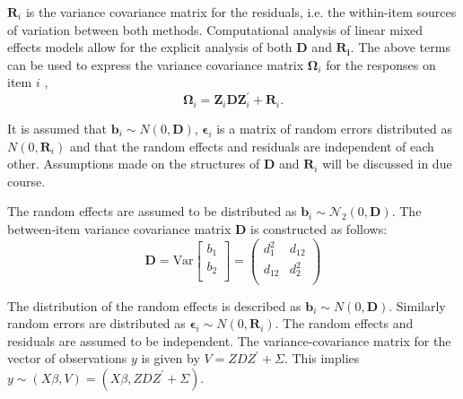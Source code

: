 \documentclass[12pt, a4paper]{report}
\theoremstyle{plain}
\theoremstyle{definition}
\theoremstyle{remark}
\begin{document}
		$\boldsymbol{R}_{i}$ is the variance covariance matrix for the residuals, i.e. the within-item sources of variation between both methods. Computational analysis of linear mixed effects models allow for the explicit analysis of both $\boldsymbol{D}$ and $\boldsymbol{R_i}$.
		The above terms can be used to express the  variance covariance matrix $\boldsymbol{\Omega}_i$ for the responses on item $i$ ,
		\[
		\boldsymbol{\Omega}_i = \boldsymbol{Z}_i \boldsymbol{D} \boldsymbol{Z}_i^{\prime} + \boldsymbol{R}_i.
		\]
		
		It is assumed that $\boldsymbol{b}_i \sim N(0,\boldsymbol{D})$, $\boldsymbol{\epsilon}_i$ is a matrix of random errors distributed as $N(0,\boldsymbol{R}_i)$ and that the random effects and residuals are independent of each other. Assumptions made on the structures of $\boldsymbol{D}$ and $\boldsymbol{R}_i$ will be discussed in due course.
		
		The random effects are assumed to be distributed as $\boldsymbol{b}_i \sim \mathcal{N}_2(0,\boldsymbol{D})$. The between-item variance covariance matrix $\boldsymbol{D}$ is constructed as follows:
		\[ \boldsymbol{D} = \mbox{Var}  \left[
		\begin{array}{c}
		b_1   \\
		b_2  \\
		\end{array}
		\right] =  \left(
		\begin{array}{cc}
		d^2_1  & d_{12} \\
		d_{12} & d^2_2 \\
		\end{array}
		\right) \]
		

	
		The distribution of the random effects is described as $\boldsymbol{b}_i \sim N(0,\boldsymbol{D})$. Similarly random errors are distributed as $\boldsymbol{\epsilon}_i \sim N(0,\boldsymbol{R}_i)$. The random effects and residuals are assumed to be independent. The variance-covariance matrix for the vector of observations $y$ is given by $V = ZDZ^{\prime}+ \Sigma.$ This implies $y \sim(X\beta, V) = (X\beta,ZDZ^{\prime}+ \Sigma)$. 
	
\end{document}
